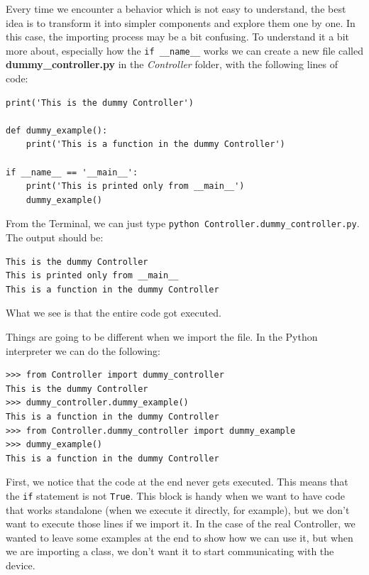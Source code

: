 Every time we encounter a behavior which is not easy to understand, the best idea is to transform it into simpler components and explore them one by one. In this case, the importing process may be a bit confusing. To understand it a bit more about, especially how the \texttt{if __name__} works we can create a new file called \textbf{dummy\_controller.py} in the \emph{Controller} folder, with the following lines of code:

\begin{verbatim}
print('This is the dummy Controller')

def dummy_example():
    print('This is a function in the dummy Controller')

if __name__ == '__main__':
    print('This is printed only from __main__')
    dummy_example()

\end{verbatim}

From the Terminal, we can just type \texttt{python Controller.dummy\_controller.py}. The output should be:

\begin{verbatim}
This is the dummy Controller
This is printed only from __main__
This is a function in the dummy Controller
\end{verbatim}

What we see is that the entire code got executed.


Things are going to be different when we import the file. In the Python interpreter we can do the following:

\begin{verbatim}
>>> from Controller import dummy_controller
This is the dummy Controller
>>> dummy_controller.dummy_example()
This is a function in the dummy Controller
>>> from Controller.dummy_controller import dummy_example
>>> dummy_example()
This is a function in the dummy Controller
\end{verbatim}

First, we notice that the code at the end never gets executed. This means that the \texttt{if} statement is not \texttt{True}. This block is handy when we want to have code that works standalone (when we execute it directly, for example), but we don't want to execute those lines if we import it. In the case of the real Controller, we wanted to leave some examples at the end to show how we can use it, but when we are importing a class, we don't want it to start communicating with the device.

